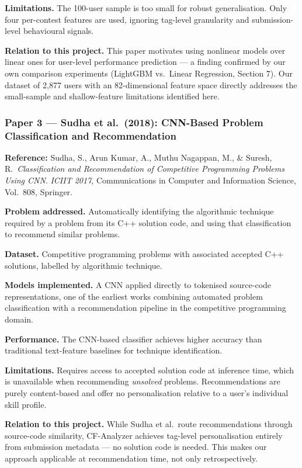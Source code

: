 \documentclass[12pt,a4paper]{article}
\begin{document}
\textbf{Limitations.}
The 100-user sample is too small for robust generalisation.
Only four per-contest features are used, ignoring tag-level granularity
and submission-level behavioural signals.
 
\textbf{Relation to this project.}
This paper motivates using nonlinear models over linear ones for
user-level performance prediction — a finding confirmed by our own
comparison experiments (LightGBM vs.\ Linear Regression, Section 7).
Our dataset of 2,877 users with an 82-dimensional feature space directly
addresses the small-sample and shallow-feature limitations identified here.
 
 
\subsubsection*{Paper 3 — Sudha et al.\ (2018): CNN-Based Problem Classification and Recommendation}
 
\textbf{Reference:}
Sudha, S., Arun Kumar, A., Muthu Nagappan, M., \& Suresh, R.\
\textit{Classification and Recommendation of Competitive Programming
Problems Using CNN}. \textit{ICIIT 2017}, Communications in Computer
and Information Science, Vol.\ 808, Springer. \cite{sudha2018cnn}
 
\textbf{Problem addressed.}
Automatically identifying the algorithmic technique required by a problem
from its C++ solution code, and using that classification to recommend
similar problems.
 
\textbf{Dataset.}
Competitive programming problems with associated accepted C++ solutions,
labelled by algorithmic technique.
 
\textbf{Models implemented.}
A CNN applied directly to tokenised source-code representations, one of
the earliest works combining automated problem classification with a
recommendation pipeline in the competitive programming domain.
 
\textbf{Performance.}
The CNN-based classifier achieves higher accuracy than traditional
text-feature baselines for technique identification.
 
\textbf{Limitations.}
Requires access to accepted solution code at inference time, which is
unavailable when recommending \textit{unsolved} problems.
Recommendations are purely content-based and offer no personalisation
relative to a user's individual skill profile.
 
\textbf{Relation to this project.}
While Sudha et al.\ route recommendations through source-code similarity,
CF-Analyzer achieves tag-level personalisation entirely from submission
metadata — no solution code is needed. This makes our approach applicable
at recommendation time, not only retrospectively.
 
\end{document}
